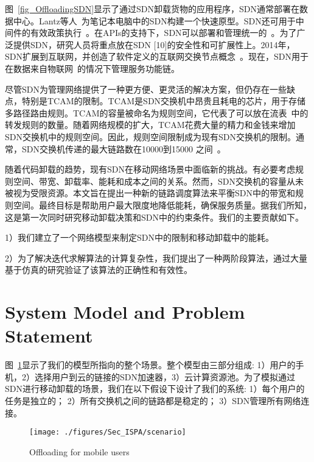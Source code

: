图~\ref{fig_OffloadingSDN}显示了通过SDN卸载货物的应用程序，SDN通常部署在数据中心。Lantz等人~\cite{Lantz:2010:NLR:1868447.1868466}为笔记本电脑中的SDN构建一个快速原型。SDN还可用于中间件的有效政策执行~\cite{Qazi:2013:SMP:2486001.2486022}。在APIs的支持下，SDN可以部署和管理统一的~\cite{Ferguson:2013:PNA:2486001.2486003}。为了广泛提供SDN，研究人员将重点放在SDN [10]的安全性和可扩展性上。2014年，SDN扩展到互联网，并创造了软件定义的互联网交换节点概念~\cite{Gupta:2014:SSD:2619239.2626300}。现在，SDN用于在数据来自物联网~\cite{Morabito:2017:FBS:3094405.3094413}的情况下管理服务功能链。

尽管SDN为管理网络提供了一种更方便、更灵活的解决方案，但仍存在一些缺点，特别是TCAM的限制。TCAM是SDN交换机中昂贵且耗电的芯片，用于存储多路径路由规则。TCAM的容量被命名为规则空间，它代表了可以放在流表~\cite{Dasgupta:2012:DMD:2400771.2401550}中的转发规则的数量。随着网络规模的扩大，TCAM花费大量的精力和金钱来增加SDN交换机中的规则空间。因此，规则空间限制成为现有SDN交换机的限制。通常，SDN交换机传递的最大链路数在10000到15000 之间~\cite{Katta:2014es}。

随着代码卸载的趋势，现有SDN在移动网络场景中面临新的挑战。有必要考虑规则空间、带宽、卸载率、能耗和成本之间的关系。然而，SDN交换机的容量从未被视为受限资源。本文旨在提出一种新的链路调度算法来平衡SDN中的带宽和规则空间。最终目标是帮助用户最大限度地降低能耗，确保服务质量。据我们所知，这是第一次同时研究移动卸载决策和SDN中的约束条件。我们的主要贡献如下。

1）我们建立了一个网络模型来制定SDN中的限制和移动卸载中的能耗。

2）为了解决迭代求解算法的计算复杂性，我们提出了一种两阶段算法，通过大量基于仿真的研究验证了该算法的正确性和有效性。

\section{System Model and Problem Statement}

图~\ref{fig_scenario}显示了我们的模型所指向的整个场景。整个模型由三部分组成: 1）用户的手机，2）选择用户到云的链接的SDN加速器，3）云计算资源池。为了模拟通过SDN进行移动卸载的场景，我们在以下假设下设计了我们的系统: 
1）每个用户的任务是独立的；
2）所有交换机之间的链路都是稳定的；
3）SDN管理所有网络连接。

\begin{figure}[!h]
  \vspace{-2em}
  \centering
  \texttt{[image: ./figures/Sec\_ISPA/scenario]}
  \vspace{-1em}
  \caption{Offloading for mobile users}
  \label{fig_scenario}
\end{figure}

